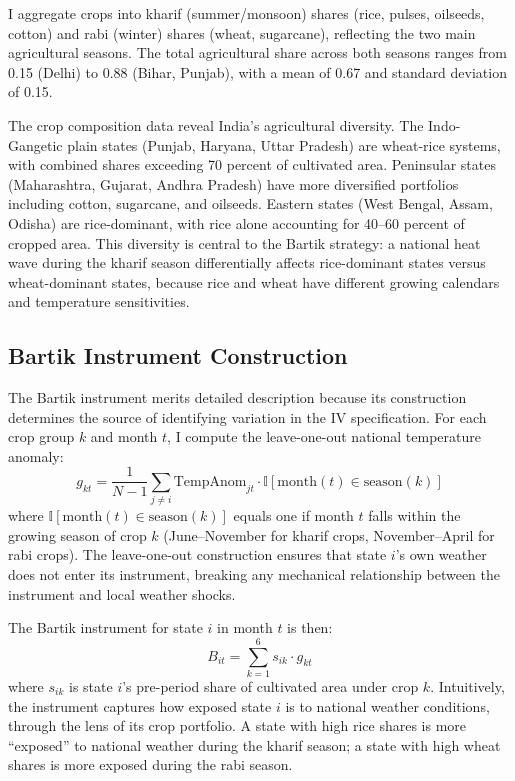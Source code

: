 \documentclass[12pt]{article}
\newcommand{\ind}{\mathbb{I}}
\begin{document}
I aggregate crops into kharif (summer/monsoon) shares (rice, pulses, oilseeds, cotton) and rabi (winter) shares (wheat, sugarcane), reflecting the two main agricultural seasons. The total agricultural share across both seasons ranges from 0.15 (Delhi) to 0.88 (Bihar, Punjab), with a mean of 0.67 and standard deviation of 0.15.

The crop composition data reveal India's agricultural diversity. The Indo-Gangetic plain states (Punjab, Haryana, Uttar Pradesh) are wheat-rice systems, with combined shares exceeding 70 percent of cultivated area. Peninsular states (Maharashtra, Gujarat, Andhra Pradesh) have more diversified portfolios including cotton, sugarcane, and oilseeds. Eastern states (West Bengal, Assam, Odisha) are rice-dominant, with rice alone accounting for 40--60 percent of cropped area. This diversity is central to the Bartik strategy: a national heat wave during the kharif season differentially affects rice-dominant states versus wheat-dominant states, because rice and wheat have different growing calendars and temperature sensitivities.

\subsection{Bartik Instrument Construction}

The Bartik instrument merits detailed description because its construction determines the source of identifying variation in the IV specification. For each crop group $k$ and month $t$, I compute the leave-one-out national temperature anomaly:
\begin{equation}
g_{kt} = \frac{1}{N-1} \sum_{j \neq i} \text{TempAnom}_{jt} \cdot \ind[\text{month}(t) \in \text{season}(k)]
\end{equation}
where $\ind[\text{month}(t) \in \text{season}(k)]$ equals one if month $t$ falls within the growing season of crop $k$ (June--November for kharif crops, November--April for rabi crops). The leave-one-out construction ensures that state $i$'s own weather does not enter its instrument, breaking any mechanical relationship between the instrument and local weather shocks.

The Bartik instrument for state $i$ in month $t$ is then:
\begin{equation}
B_{it} = \sum_{k=1}^{6} s_{ik} \cdot g_{kt}
\end{equation}
where $s_{ik}$ is state $i$'s pre-period share of cultivated area under crop $k$. Intuitively, the instrument captures how exposed state $i$ is to national weather conditions, through the lens of its crop portfolio. A state with high rice shares is more ``exposed'' to national weather during the kharif season; a state with high wheat shares is more exposed during the rabi season.
\end{document}
